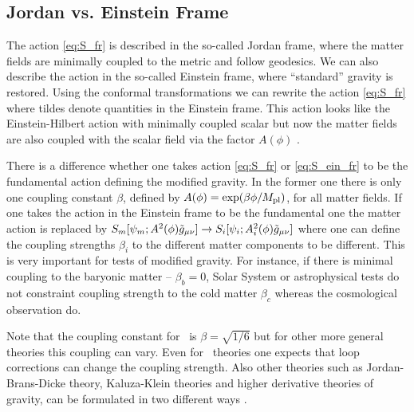 \subsection{Jordan vs. Einstein Frame}
The action \eqref{eq:S_fr} is described in the so-called Jordan frame, where the matter fields are minimally coupled to the metric and follow geodesics. We can also describe the action in the so-called Einstein frame, where ``standard'' gravity is restored. Using the conformal transformations
we can rewrite the action \eqref{eq:S_fr}
where tildes denote quantities in the Einstein frame. This action looks like the Einstein-Hilbert action with minimally coupled scalar but now the matter fields are also coupled with the scalar field via the factor $A(\phi)$ . %

There is a difference whether one takes action \eqref{eq:S_fr} or \eqref{eq:S_ein_fr} to be the fundamental action defining the modified gravity. In the former one there is only one coupling constant $\beta$, defined by $A(\phi)=\exp(\beta\phi/M_{\text{\scriptsize pl}})$, for all matter fields. If one takes the action in the Einstein frame to be the fundamental one the matter action is replaced by $S_m[\psi_m;A^2(\phi)\tilde{g}_{\mu\nu}]\rightarrow S_i[\psi_i;A_i^2(\phi)\tilde{g}_{\mu\nu}]$ where one can define the coupling strengths $\beta_i$ to the different matter components to be different. This is very important for tests of modified gravity. For instance, if there is minimal coupling to the baryonic matter -- $\beta_b=0$, Solar System or astrophysical tests do not constraint coupling strength to the cold matter $\beta_c$ whereas the cosmological observation do.

Note that the coupling constant for \fR\ is $\beta=\sqrt{1/6}$ but for other more general theories this coupling can vary. Even for \fR\ theories one expects that loop corrections can change the coupling strength. Also other theories such as Jordan-Brans-Dicke theory, Kaluza-Klein theories and higher derivative theories of gravity, can be formulated in two different ways \parencite{Faraoni:1998qx}.


